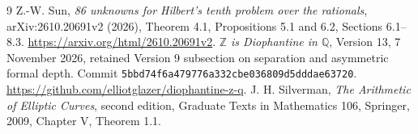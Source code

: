 \documentclass[11pt,a4paper]{article}
\theoremstyle{remark}\newtheorem{remark}[theorem]{Remark}
\newcommand{\Q}{\mathbb Q}\newcommand{\Z}{\mathbb Z}
\begin{document}
\begin{thebibliography}{9}
 Z.-W. Sun, \emph{86 unknowns for Hilbert's tenth problem
over the rationals}, arXiv:2610.20691v2 (2026), Theorem 4.1,
Propositions 5.1 and 6.2, Sections 6.1--8.3.
\url{https://arxiv.org/html/2610.20691v2}.
 \emph{$\Z$ is Diophantine in $\Q$}, Version 13,
7 November 2026, retained Version 9 subsection on separation and
asymmetric formal depth. Commit
\texttt{5bbd74f6a479776a332cbe036809d5dddae63720}.
\url{https://github.com/elliotglazer/diophantine-z-q}.
 J. H. Silverman, \emph{The Arithmetic of Elliptic
Curves}, second edition, Graduate Texts in Mathematics 106,
Springer, 2009, Chapter V, Theorem 1.1.
\end{thebibliography}
\end{document}
